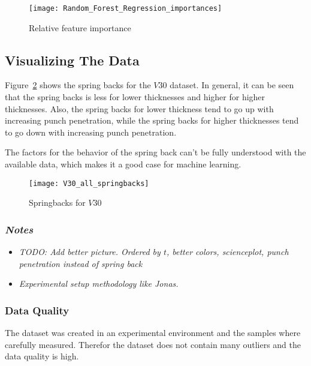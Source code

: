 \begin{figure}[htb]
    \begin{tcolorbox}[arc=0pt,boxrule=0.5pt]
        \centering
        \texttt{[image: Random\_Forest\_Regression\_importances]}
        \caption{Relative feature importance}
        \label{fig:rf_feature_importance}
    \end{tcolorbox}
\end{figure}

\subsection{Visualizing The Data}\label{subsec:visualizing-the-data}
Figure~\ref{fig:v30_springbacks} shows the spring backs for the $V30$ dataset.
In general, it can be seen that the spring backs is less for lower
thicknesses and higher for
higher thicknesses.
Also, the spring backs for lower thickness tend to go up with increasing
punch penetration, while
the spring backs
for higher thicknesses tend to go down with increasing punch penetration.

The factors for the behavior of the spring back can't be fully understood
with the available
data, which makes it a
good case for machine learning.

\begin{figure}[htb]
    \begin{tcolorbox}[arc=0pt,boxrule=0.5pt]
        \centering
        \texttt{[image: V30\_all\_springbacks]}
        \caption{Springbacks for $V30$}
        \label{fig:v30_springbacks}
    \end{tcolorbox}
\end{figure}

\subsubsection*{\textit{Notes}}
\begin{itemize}
    \item \textit{TODO: Add better picture. Ordered by $t$, better colors,
        scienceplot, punch
        penetration instead of spring back}
    \item \textit{Experimental setup methodology like Jonas.}
\end{itemize}

\subsubsection{Data Quality}
The dataset was created in an experimental environment and the samples where
carefully measured.
Therefor the dataset does not contain many outliers and the data quality is
high.

